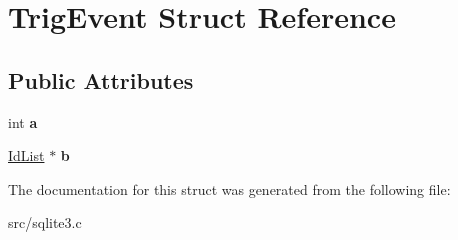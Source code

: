 \hypertarget{struct_trig_event}{\section{Trig\-Event Struct Reference}
\label{struct_trig_event}
}
\subsection*{Public Attributes}
\begin{DoxyCompactItemize}
\item 
\hypertarget{struct_trig_event_a19ac5a5e59e08350f72ec49cf8fccbb6}{int {\bfseries a}}\label{struct_trig_event_a19ac5a5e59e08350f72ec49cf8fccbb6}

\item 
\hypertarget{struct_trig_event_a86ef160cde95382e98b7934614e7f79f}{\hyperlink{struct_id_list}{Id\-List} $\ast$ {\bfseries b}}\label{struct_trig_event_a86ef160cde95382e98b7934614e7f79f}

\end{DoxyCompactItemize}


The documentation for this struct was generated from the following file\-:\begin{DoxyCompactItemize}
\item 
src/sqlite3.\-c\end{DoxyCompactItemize}
